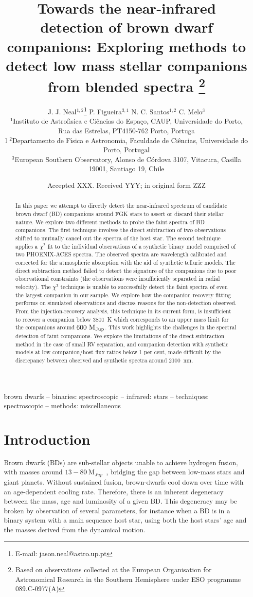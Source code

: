 \documentclass[fleqn,usenatbib]{mnras}
\title[Towards the nIR detection of BD companions]{Towards the near-infrared detection of brown dwarf companions: Exploring methods to detect low mass stellar companions from blended spectra \thanks{Based on observations collected at the European Organisation for Astronomical Research in the Southern Hemisphere under ESO programme 089.C-0977(A)}}
\author[J. J. Neal et al.]{
J. J. Neal$^{1,2}$\thanks{E-mail: jason.neal@astro.up.pt}
P. Figueira$^{3,1}$
N. C. Santos$^{1,2}$
C. Melo$^{3}$
\\
$^{1}$Instituto de Astrof\'{\i}sica e Ci\^encias do Espa\c{c}o, CAUP, Universidade do Porto, Rua das Estrelas, PT4150-762 Porto, Portuga\\l
$^{2}$Departamento de F\'{\i}sica e Astronomia, Faculdade de Ci\^{e}ncias, Universidade do Porto, Portugal\\
$^{3}$European Southern Observatory, Alonso de C\'{o}rdova 3107, Vitacura, Casilla 19001, Santiago 19, Chile\\
}
\date{Accepted XXX. Received YYY; in original form ZZZ}
\newcommand*\bl{\color{blue}}
\begin{document}
\label{firstpage}
\pagerange{\pageref{firstpage}--\pageref{lastpage}}
\maketitle

\begin{abstract}
   {In this paper we attempt to directly detect the near-infrared spectrum of candidate brown dwarf (BD) companions around FGK stars to assert or discard their stellar nature. We explore two different methods to probe the faint spectra of BD companions. The first technique involves the direct subtraction of two observations shifted to mutually cancel out the spectra of the host star. The second technique applies a \(\chi^{2}\) fit to the individual observations of a synthetic binary model comprised of two PHOENIX-ACES spectra. The observed spectra are wavelength calibrated and corrected for the atmospheric absorption with the aid of synthetic telluric models. The direct subtraction method failed to detect the signature of the companions due to poor observational constraints (the observations were insufficiently separated in radial velocity). The \(\chi^{2}\) technique is unable to successfully detect the faint spectra of even the largest companion in our sample. We explore how the companion recovery fitting performs on simulated observations and discuss reasons for the non-detection observed. From the injection-recovery analysis, this technique in its current form, is insufficient to recover a companion below 3800~K which corresponds to an upper mass limit for the companions around \(\rm 600~M_{Jup}\). This work highlights the challenges in the spectral detection of faint companions. We explore the limitations of the direct subtraction method in the case of small RV separation, and companion detection with synthetic models at low companion/host flux ratios below 1 per cent, made difficult by the discrepancy between observed and synthetic spectra around 2100~nm.}
\end{abstract}

\begin{keywords}
brown dwarfs -- binaries: spectroscopic -- infrared: stars -- techniques: spectroscopic -- methods: miscellaneous
\end{keywords}


\section{Introduction}
\label{sec:intro}
Brown dwarfs (BDs) are sub-stellar objects unable to achieve hydrogen fusion, with masses around \(13-80~\textrm{M}_{Jup}\)~\citep{chabrier_theory_2000}, bridging the gap between low-mass stars and giant planets. Without sustained fusion, brown-dwarfs cool down over time with an age-dependent cooling rate. Therefore, there is an inherent degeneracy between the mass, age and luminosity of a given BD\citep{burrows_nongray_1997}. This degeneracy may be broken by observation of several parameters, for instance when a BD is in a binary system with a main sequence host star, using both the {\bl host stars' age} and the masses derived from the dynamical motion.
\end{document}
